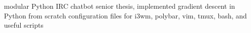 \begin{cvskills}
  {modular Python IRC chatbot
    \hfill {} \hskip 0.4in}
  {senior thesis, implemented gradient descent in Python from scratch
    \hfill {} \hskip 0.4in}
  {configuration files for i3wm, polybar, vim, tmux, bash, and useful scripts
  \hfill {} \hskip 0.4in}
\end{cvskills}
